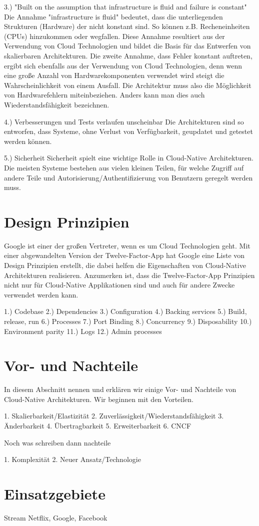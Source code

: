 3.) "Built on the assumption that infrastructure is fluid and failure is constant"
Die Annahme "infrastructure is fluid" bedeutet, dass die unterliegenden Strukturen (Hardware) der nicht konstant sind. So können z.B. Recheneinheiten (CPUs) hinzukommen oder wegfallen. Diese Annahme resultiert aus der Verwendung von Cloud Technologien und bildet die Basis für das Entwerfen von skalierbaren Architekturen.
Die zweite Annahme, dass Fehler konstant auftreten, ergibt sich ebenfalls aus der Verwendung von Cloud Technologien, denn wenn eine große Anzahl von Hardwarekomponenten verwendet wird steigt die Wahrscheinlichkeit von einem Ausfall. Die Architektur muss also die Möglichkeit von Hardwarefehlern miteinbeziehen. Anders kann man dies auch Wiederstandsfähigkeit bezeichnen.

4.) Verbesserungen und Tests verlaufen unscheinbar
Die Architekturen sind so entworfen, dass Systeme, ohne Verlust von Verfügbarkeit, geupdatet und getestet werden können.

5.) Sicherheit
Sicherheit spielt eine wichtige Rolle in Cloud-Native Architekturen. Die meisten Systeme bestehen  aus vielen kleinen Teilen, für welche Zugriff auf andere Teile und Autorisierung/Authentifizierung von Benutzern geregelt werden muss.

\section{Design Prinzipien}
Google ist einer der großen Vertreter, wenn es um Cloud Technologien geht. Mit einer abgewandelten Version der Twelve-Factor-App hat Google eine Liste von Design Prinzipien erstellt, die dabei helfen die Eigenschaften von Cloud-Native Architekturen realisieren. Anzumerken ist, dass die Twelve-Factor-App Prinzipien nicht nur für Cloud-Native Applikationen sind und auch für andere Zwecke verwendet werden kann.

1.) Codebase
2.) Dependencies
3.) Configuration
4.) Backing services
5.) Build, release, run
6.) Processes
7.) Port Binding
8.) Concurrency
9.) Disposability
10.) Environment parity
11.) Logs
12.) Admin processes

\section{Vor- und Nachteile}
In diesem Abschnitt nennen und erklären wir einige Vor- und Nachteile von Cloud-Native Architekturen. Wir beginnen mit den Vorteilen.

1. Skalierbarkeit/Elastizität
2. Zuverlässigkeit/Wiederstandsfähigkeit
3. Änderbarkeit
4. Übertragbarkeit
5. Erweiterbarkeit
6. CNCF

Noch was schreiben dann nachteile

1. Komplexität
2. Neuer Ansatz/Technologie


\section{Einsatzgebiete}
Stream Netflix, Google, Facebook